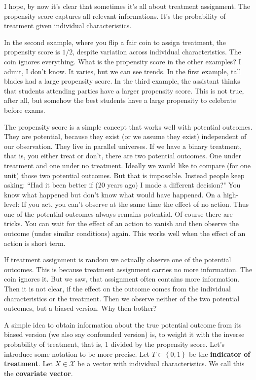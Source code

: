 I hope, by now it's clear that sometimes it's all about treatment assignment. 
The propensity score\cite{Rosenbaum1983} captures all relevant informations.
It's the probability of treatment given individual characteristics. 

In the second example, where you flip a fair coin to assign treatment, the propensity score is $1/2$, despite variation across individual characteristics.
The coin ignores everything.
What is the propensity score in the other examples?
I admit, I don't know.
It varies, but we can see trends. 
In the first example, tall blades had a large propensity score.
In the third example, the assistant thinks that students attending parties have a larger propensity score. This is not true, after all, but somehow the best students have a large propensity to celebrate before exams. 

The propensity score is a simple concept that works well with potential outcomes.
They are potential, because they exist (or we assume they exist) independent of our observation. They live in parallel universes.
If we have a binary treatment, that is, you either treat or don't, there are two potential outcomes. One under treatment and one under no treatment.
Ideally we would like to compare (for one unit) those two potential outcomes.
But that is impossible. 
Instead people keep asking:
“Had it been better if (20 years ago) I made a different decision?"
You know what happened but don't know what would have happened.
On a high-level: If you act, you can't observe at the same time the effect of no action.
Thus one of the potential outcomes always remains potential.
Of course there are tricks. You can  wait for the effect of an action to vanish and then observe the outcome (under similar conditions) again.
This works well when the effect of an action is short term.

If treatment assignment is random we actually observe one of the potential outcomes.
This is because treatment assignment carries no more information.
The coin ignores it.
But we saw, that assignment often contains more information.
Then it is not clear, if the effect on the outcome comes from the individual characteristics or the treatment.
Then we observe neither of the two potential outcomes, but a biased version.
Why then bother?

A simple idea to obtain information about the true potential outcome from its biased version (we also say confounded version) is, to weight it with the inverse probability of treatment, that is, 1 divided by the propensity score. Let's introduce some notation to be more precise.
Let $T\in \left\{ 0,1 \right\}$ be the \textbf{indicator of treatment}. 
Let $X\in\mathcal{X}$ be a vector with individual characteristics. We call this the \textbf{covariate vector}. 

